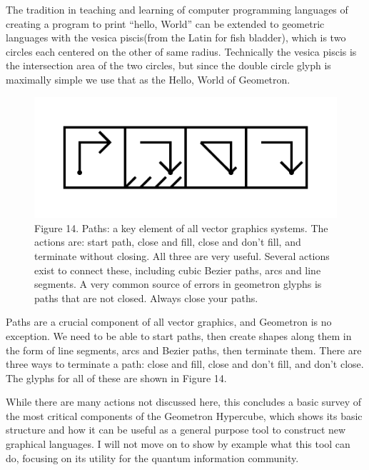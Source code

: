 \documentclass[11pt]{article}
\begin{document}
    The tradition in teaching and learning of computer programming languages of creating a program to print ``hello, World'' can be extended to geometric languages with the vesica piscis(from the Latin for fish bladder), which is two circles each centered on the other of same radius.  Technically the vesica piscis is the intersection area of the two circles, but since the double circle glyph is maximally simple we use that as the Hello, World of Geometron.



\begin{figure}

\includegraphics[width=\linewidth]{figures/figure14_paths.png}

\caption{Figure 14. Paths: a key element of all vector graphics systems.  The actions are: start path, close and fill, close and don't fill, and terminate without closing.  All three are very useful.  Several actions exist to connect these, including cubic Bezier paths, arcs and line segments.  A very common source of errors in geometron glyphs is paths that are not closed.  Always close your paths. }
\end{figure}




    Paths are a crucial component of all vector graphics, and Geometron is no exception.  We need to be able to start paths, then create shapes along them in the form of line segments, arcs and Bezier paths, then terminate them.  There are three ways to terminate a path: close and fill, close and don't fill, and don't close.  The glyphs for all of these are shown in Figure 14.  




    While there are many actions not discussed here, this concludes a basic survey of the most critical components of the Geometron Hypercube, which shows its basic structure and how it can be useful as a general purpose tool to construct new graphical languages.  I will not move on to show by example what this tool can do, focusing on its utility for the quantum information community.
\end{document}
